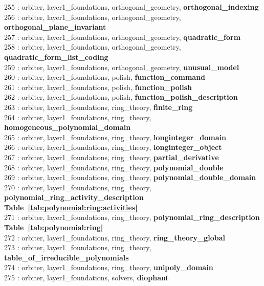 255 : orbiter, layer1\_foundations, orthogonal\_geometry, {\bf orthogonal\_indexing}\\
256 : orbiter, layer1\_foundations, orthogonal\_geometry, {\bf orthogonal\_plane\_invariant}\\
257 : orbiter, layer1\_foundations, orthogonal\_geometry, {\bf quadratic\_form}\\
258 : orbiter, layer1\_foundations, orthogonal\_geometry, {\bf quadratic\_form\_list\_coding}\\
259 : orbiter, layer1\_foundations, orthogonal\_geometry, {\bf unusual\_model}\\
260 : orbiter, layer1\_foundations, polish, {\bf function\_command}\\
261 : orbiter, layer1\_foundations, polish, {\bf function\_polish}\\
262 : orbiter, layer1\_foundations, polish, {\bf function\_polish\_description}\\
263 : orbiter, layer1\_foundations, ring\_theory, {\bf finite\_ring}\\
264 : orbiter, layer1\_foundations, ring\_theory, {\bf homogeneous\_polynomial\_domain}\\
265 : orbiter, layer1\_foundations, ring\_theory, {\bf longinteger\_domain}\\
266 : orbiter, layer1\_foundations, ring\_theory, {\bf longinteger\_object}\\
267 : orbiter, layer1\_foundations, ring\_theory, {\bf partial\_derivative}\\
268 : orbiter, layer1\_foundations, ring\_theory, {\bf polynomial\_double}\\
269 : orbiter, layer1\_foundations, ring\_theory, {\bf polynomial\_double\_domain}\\
270 : orbiter, layer1\_foundations, ring\_theory, {\bf polynomial\_ring\_activity\_description Table~\ref{tab:polynomial:ring:activities}}\\
271 : orbiter, layer1\_foundations, ring\_theory, {\bf polynomial\_ring\_description Table~\ref{tab:polynomial:ring}}\\
272 : orbiter, layer1\_foundations, ring\_theory, {\bf ring\_theory\_global}\\
273 : orbiter, layer1\_foundations, ring\_theory, {\bf table\_of\_irreducible\_polynomials}\\
274 : orbiter, layer1\_foundations, ring\_theory, {\bf unipoly\_domain}\\
275 : orbiter, layer1\_foundations, solvers, {\bf diophant}\\
